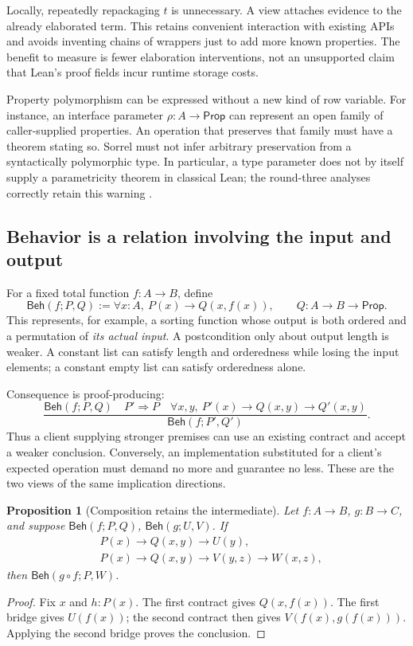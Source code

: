 \documentclass[11pt,a4paper]{article}
\newcommand{\Prop}{\mathsf{Prop}}\newcommand{\Type}{\mathsf{Type}}
\newcommand{\Beh}{\mathsf{Beh}}\newcommand{\Min}{\operatorname{Min}}
\numberwithin{equation}{section}
\newtheorem{proposition}[theorem]{Proposition}
\theoremstyle{definition}\newtheorem{definition}[theorem]{Definition}
\theoremstyle{remark}\newtheorem{remark}[theorem]{Remark}
\begin{document}
Locally, repeatedly repackaging \(t\) is unnecessary. A view attaches evidence
to the already elaborated term. This retains convenient interaction with
existing APIs and avoids inventing chains of wrappers just to add more known
properties. The benefit to measure is fewer elaboration interventions, not
an unsupported claim that Lean's proof fields incur runtime storage costs.

Property polymorphism can be expressed without a new kind of row variable.
For instance, an interface parameter \(\rho:A\to\Prop\) can represent an open
family of caller-supplied properties. An operation that preserves that family
must have a theorem stating so. Sorrel must not infer arbitrary preservation
from a syntactically polymorphic type. In particular, a type parameter does
not by itself supply a parametricity theorem in classical Lean; the round-three
analyses correctly retain this warning \cite{synA,synB,leanAxioms}.

\subsection{Behavior is a relation involving the input and output}
For a fixed total function \(f:A\to B\), define
\[
 \Beh(f;P,Q):=\forall x:A,\ P(x)\to Q(x,f(x)),
 \qquad Q:A\to B\to\Prop.
\]
This represents, for example, a sorting function whose output is both ordered
and a permutation of \emph{its actual input}. A postcondition only about output
length is weaker. A constant list can satisfy length and orderedness while
losing the input elements; a constant empty list can satisfy orderedness alone.

Consequence is proof-producing:
\[
 \frac{\Beh(f;P,Q)\quad P'\Rightarrow P\quad
       \forall x,y,\ P'(x)\to Q(x,y)\to Q'(x,y)}
      {\Beh(f;P',Q')}.
\]
Thus a client supplying stronger premises can use an existing contract and
accept a weaker conclusion. Conversely, an implementation substituted for a
client's expected operation must demand no more and guarantee no less.
These are the two views of the same implication directions.

\begin{proposition}[Composition retains the intermediate]\label{prop:compose}
Let \(f:A\to B\), \(g:B\to C\), and suppose
\(\Beh(f;P,Q)\), \(\Beh(g;U,V)\). If
\begin{align*}
 &P(x)\to Q(x,y)\to U(y),\\
 &P(x)\to Q(x,y)\to V(y,z)\to W(x,z),
\end{align*}
then \(\Beh(g\circ f;P,W)\).
\end{proposition}
\begin{proof}
Fix \(x\) and \(h:P(x)\). The first contract gives \(Q(x,f(x))\).
The first bridge gives \(U(f(x))\); the second contract then gives
\(V(f(x),g(f(x)))\). Applying the second bridge proves the conclusion.
\end{proof}
\end{document}

